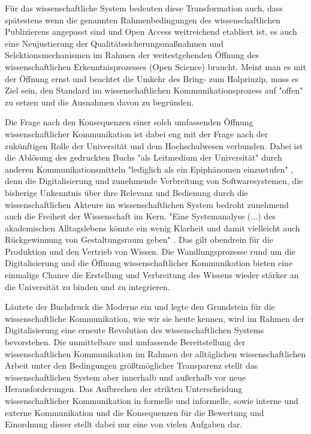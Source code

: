 Für das wissenschaftliche System bedeuten diese Transformation auch, dass spätestens wenn die genannten Rahmenbedingungen des wissenschaftlichen Publizierens angepasst sind und Open Access weitreichend etabliert ist, es auch eine Neujustierung der Qualitätssicherungsmaßnahmen und Selektionsmechanismen im Rahmen der weitestgehenden Öffnung des wissenschaftlichen Erkenntnisprozesses (Open Science) braucht. Meint man es mit der Öffnung ernst und beachtet die Umkehr des Bring- zum Holprinzip, muss es Ziel sein, den Standard im wissenschaftlichen Kommunikationsprozess auf "offen" zu setzen und die Ausnahmen davon zu begründen.

Die Frage nach den Konsequenzen einer solch umfassenden Öffnung wissenschaftlicher Kommunikation ist dabei eng mit der Frage nach der zukünftigen Rolle der Universität und dem Hochschulwesen verbunden. Dabei ist die Ablösung des gedruckten Buchs "als Leitmedium der Universität" durch anderen Kommunikationsmitteln "lediglich als ein Epiphänomen einzustufen" \cite{Warnke_2012}, denn die Digitalisierung und zunehmende Verbreitung von Softwaresystemen, die bisherige Unkenntnis über ihre Relevanz und Bedienung durch die wissenschaftlichen Akteure im wissenschaftlichen System bedroht zunehmend auch die Freiheit der Wissenschaft im Kern. "Eine Systemanalyse (...) des akademischen Alltagslebens  könnte ein wenig Klarheit und damit vielleicht auch Rückgewinnung von Gestaltungsraum geben" \cite{Warnke_2012}. Das gilt obendrein für die Produktion und den Vertrieb von Wissen. Die Wandlungsprozesse rund um die Digitalisierung und die Öffnung wissenschaftlicher Kommunikation bieten eine einmalige Chance die Erstellung und Verbreitung des Wissens wieder stärker an die Universität zu binden und zu integrieren.

Läutete der Buchdruck die Moderne ein und legte den Grundstein für die wissenschaftliche Kommunikation, wie wir sie heute kennen, wird im Rahmen der Digitalisierung eine erneute Revolution des wissenschaftlichen Systems bevorstehen. Die unmittelbare und umfassende Bereitstellung der wissenschaftlichen Kommunikation im Rahmen der alltäglichen wissenschaftlichen Arbeit unter den Bedingungen größtmöglicher Transparenz stellt das wissenschaftlichen System aber innerhalb und außerhalb vor neue Herausforderungen. Das Aufbrechen der strikten Unterscheidung wissenschaftlicher Kommunikation in formelle und informelle, sowie interne und externe Kommunikation und die Konsequenzen für die Bewertung und Einordnung dieser stellt dabei nur eine von vielen Aufgaben dar.

